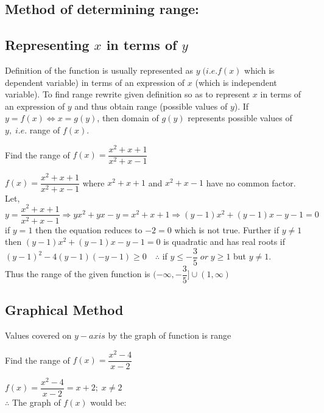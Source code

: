 \documentclass[a4paper,10.5pt,fleqn]{article}
\begin{document}
\subsection{Method of determining range:}
\subsection*{Representing $x$ in terms of $y$}Definition of the function is usually represented as $y\; (i.e. f(x)$ which is dependent variable) in terms of an expression of $x$ (which is independent variable). To find range rewrite given definition so as to represent $x$ in terms of an expression of $y$ and thus obtain range (possible values of $y$).
If $y = f(x)\Longleftrightarrow  x = g(y)$, then domain of $g(y)$ represents possible values of $y,\; i.e$. range of $f(x)$.
\begin{example}
Find the range of $f(x) = \dfrac{x^2+x+1}{x^2+x-1}$
\end{example}
\begin{soln}
$f(x) = \dfrac{x^2+x+1}{x^2+x-1}$ where $x^2+x+1$ and $x^2+x-1$ have no common factor.\\
Let, $y = \dfrac{x^2+x+1}{x^2+x-1}\Rightarrow yx^2+yx-y = x^2+x+1 \Rightarrow (y-1)x^{2}+(y-1)x -y-1=0$  if $y=1$ then the equation reduces to $-2=0$ which is not true. Further if $y\neq 1$ then $(y-1)x^{2}+(y-1)x -y-1=0$ is quadratic and has real roots if $(y-1)^{2}-4(y-1)(-y-1)\ge 0\quad \therefore$ if $y\le -\dfrac{3}{5}\; or\; y\ge 1$ but $y\neq 1.$ \\ Thus the range of the given function is $(-\infty,-\dfrac{3}{5}]\cup (1,\infty)$
\end{soln}
\subsection*{Graphical Method}
Values covered on $y-axis$ by the graph of function is range
\begin{example}
Find the range of $f(x) = \dfrac{x^2-4}{x-2}$
\end{example}
\begin{soln}
$ f(x) =\dfrac{x^2 -4}{x-2} = x+2;\; x\neq 2 $\\
$\therefore$ The graph of $f(x)$ would be:

\end{soln}
\end{document}
